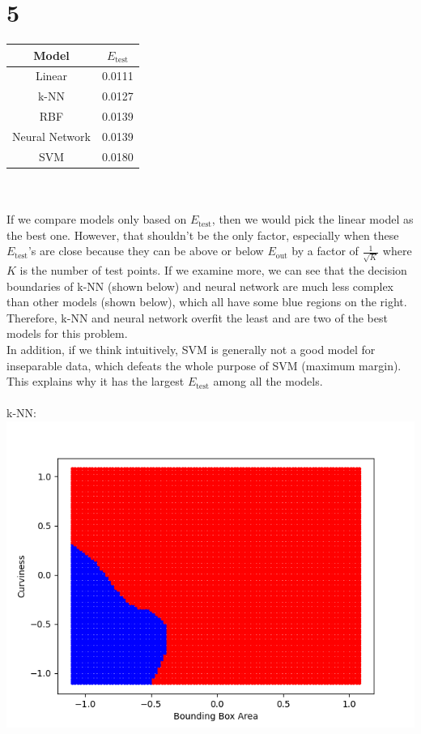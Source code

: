 \documentclass{article}
\begin{document}
	\section*{5}
		\begin{tabular}{c|c}
			Model & $E_\text{test}$\\
			\hline
			Linear & 0.0111\\
			k-NN & 0.0127\\
			RBF & 0.0139\\
			Neural Network & 0.0139\\
			SVM & 0.0180
		\end{tabular}\\\\
		If we compare models only based on $E_\text{test}$, then we would pick the linear model as the best one. However, that shouldn't be the only factor, especially when these $E_\text{test}$'s are close because they can be above or below $E_\text{out}$ by a factor of $\frac1{\sqrt K}$ where $K$ is the number of test points. If we examine more, we can see that the decision boundaries of k-NN (shown below) and neural network are much less complex than other models (shown below), which all have some blue regions on the right. Therefore, k-NN and neural network overfit the least and are two of the best models for this problem.\\
		In addition, if we think intuitively, SVM is generally not a good model for inseparable data, which defeats the whole purpose of SVM (maximum margin). This explains why it has the largest $E_\text{test}$ among all the models.\\\\
		k-NN:\\
		\includegraphics[scale=0.8]{../hw11/1b}\\
\end{document}

